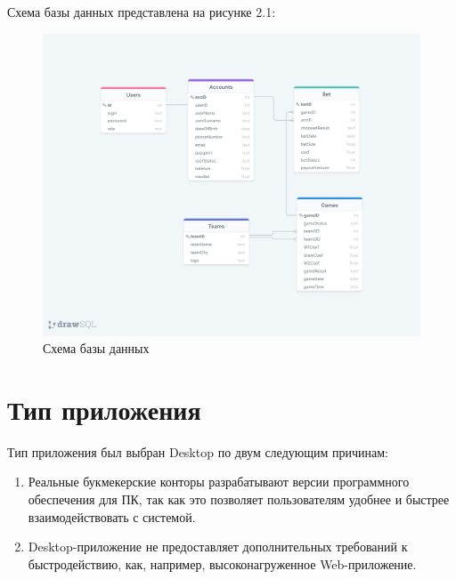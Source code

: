 \newpage

Схема базы данных представлена на рисунке 2.1:
\FloatBarrier
\begin{figure}[hp]	
	\begin{center}
		\includegraphics[width=\linewidth]{inc/scheme.png}
	\end{center}
	\caption{Схема базы данных}
	\label{fig::scheme}
\end{figure}
\FloatBarrier

\section{Тип приложения}
Тип приложения был выбран Desktop по двум следующим причинам:
\begin{enumerate}
	\item Реальные букмекерские конторы разрабатывают версии программного обеспечения для ПК, так как это позволяет пользователям удобнее и быстрее взаимодействовать с системой.
	\item Desktop-приложение не предоставляет дополнительных требований к быстродействию, как, например, высоконагруженное Web-приложение. 
\end{enumerate}

